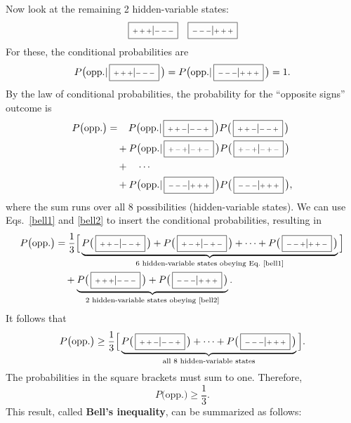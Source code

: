 \documentclass[prx,12pt]{revtex4-2}
\def\hvbox[#1]#2{\,\boxed{\scalebox{0.7}{$\,#1$}|\scalebox{0.7}{$#2\,$}}}
\begin{document}
Now look at the remaining 2 hidden-variable states:
\begin{equation*}
    \hvbox[+++]{---} \;\;\;
    \hvbox[---]{+++}
\end{equation*}
For these, the conditional probabilities are
\begin{equation}
  P\big(\textrm{opp.} | \hvbox[+++]{---}\,\big) =
  P\big(\textrm{opp.} | \hvbox[---]{+++}\,\big) = 1.
  \label{bell2}
\end{equation}
By the law of conditional probabilities, the probability for the
``opposite signs'' outcome is
\begin{align}
  \begin{aligned}
    P\big(\textrm{opp.}\big) &= \;\;\;
    P\big(\textrm{opp.} | \hvbox[++-]{--+}\,\big)
    P\big(\hvbox[++-]{--+}\,\big) \\
    &\quad+ P\big(\textrm{opp.} | \hvbox[+-+]{-+-}\,\big)
    P\big(\hvbox[+-+]{-+-}\,\big) \\
    &\quad+ \quad \cdots \\
    &\quad+ P\big(\textrm{opp.} | \hvbox[---]{+++}\,\big)
    P\big(\hvbox[---]{+++}\,\big),
  \end{aligned}
\end{align}
where the sum runs over all 8 possibilities (hidden-variable states).
We can use Eqs.~\eqref{bell1} and \eqref{bell2} to insert the
conditional probabilities, resulting in
\begin{align}
  \begin{aligned}
    P\big(\textrm{opp.}\big) &=
    \frac{1}{3} \Big[\underbrace{P\big(\hvbox[++-]{--+}\,\big)
      + P\big(\hvbox[+-+]{-+-}\,\big)
      + \cdots + P\big(\hvbox[--+]{++-}\,\big)}_{\textrm{6 hidden-variable states
obeying Eq.~\eqref{bell1}}}\Big] \\
    &\quad + \underbrace{P\big(\hvbox[+++]{---}\,\big)
    + P\big(\hvbox[---]{+++}\,\big)}_{\textrm{2 hidden-variable states obeying \eqref{bell2}}}.
  \end{aligned}
\end{align}
It follows that
\begin{equation}
  P\big(\textrm{opp.}\big) \ge
  \frac{1}{3} \Big[\underbrace{P\big(\hvbox[++-]{--+}\,\big)
      + \cdots + P\big(\hvbox[---]{+++}\,\big)}_{\textrm{all 8 hidden-variable states}}
    \Big].
  \label{bellprob}
\end{equation}
The probabilities in the square brackets must sum to one.  Therefore,
\begin{equation}
  P\big(\textrm{opp.}\big) \ge \frac{1}{3}.
  \label{bellresult}
\end{equation}
This result, called \textbf{Bell's inequality}, can be summarized as
follows:
\end{document}
